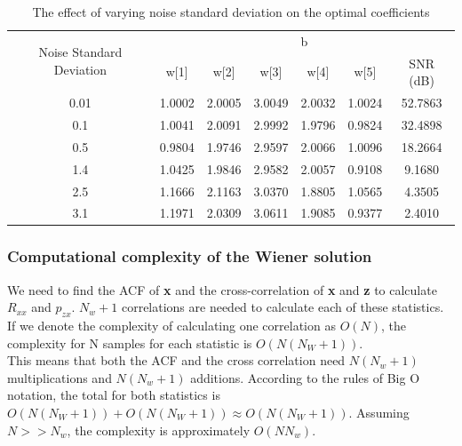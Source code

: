 \documentclass{article}
\begin{document}
\begin{table}[h!]
\centering
\begin{tabular}{|c|c|c|c|c|c|c|}
\hline
\multirow{2}{*}{Noise Standard Deviation} & \multicolumn{6}{c|}{b}                                          \\ \cline{2-7} 
                                          & w{[}1{]} & w{[}2{]} & w{[}3{]} & w{[}4{]} & w{[}5{]} & SNR (dB) \\ \hline
0.01                                      & 1.0002   & 2.0005   & 3.0049   & 2.0032   & 1.0024   & 52.7863  \\ \hline
0.1                                       & 1.0041   & 2.0091   & 2.9992   & 1.9796   & 0.9824   & 32.4898  \\ \hline
0.5                                       & 0.9804   & 1.9746   & 2.9597   & 2.0066   & 1.0096   & 18.2664  \\ \hline
1.4                                       & 1.0425   & 1.9846   & 2.9582   & 2.0057   & 0.9108   & 9.1680   \\ \hline
2.5                                       & 1.1666   & 2.1163   & 3.0370   & 1.8805   & 1.0565   & 4.3505   \\ \hline
3.1                                       & 1.1971   & 2.0309   & 3.0611   & 1.9085   & 0.9377   & 2.4010   \\ \hline
\end{tabular}
\caption{\label{fig:wiener_noise} The effect of varying noise standard deviation on the optimal coefficients}
\end{table}


\subsubsection{Computational complexity of the Wiener solution}

We need to find the ACF of \textbf{x} and the cross-correlation of \textbf{x} and \textbf{z} to calculate $R_{xx}$ and $p_{zx}$. $N_w + 1$ correlations are needed to calculate each of these statistics. If we denote the complexity of calculating one correlation as $O(N)$, the complexity for N samples for each statistic is $O(N(N_W+1))$.\\

This means that both the ACF and the cross correlation need $N(N_w+1)$ multiplications and $N(N_w+1)$ additions. According to the rules of Big O notation, the total for both statistics is $O(N(N_W+1)) + O(N(N_W+1)) \approx O(N(N_W+1))$. Assuming $N>>N_w$, the complexity is approximately $O(NN_w)$.\\
\end{document}
